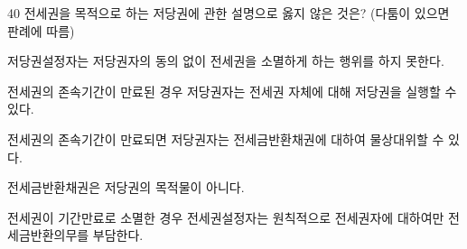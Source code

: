 \begin{question}{40}
전세권을 목적으로 하는 저당권에 관한 설명으로 옳지 않은 것은? (다툼이 있으면 판례에 따름)
\begin{choices}
  \item 저당권설정자는 저당권자의 동의 없이 전세권을 소멸하게 하는 행위를 하지 못한다.
  \item 전세권의 존속기간이 만료된 경우 저당권자는 전세권 자체에 대해 저당권을 실행할 수 있다.
  \item 전세권의 존속기간이 만료되면 저당권자는 전세금반환채권에 대하여 물상대위할 수 있다.
  \item 전세금반환채권은 저당권의 목적물이 아니다.
  \item 전세권이 기간만료로 소멸한 경우 전세권설정자는 원칙적으로 전세권자에 대하여만 전세금반환의무를 부담한다.
\end{choices}
\end{question}
